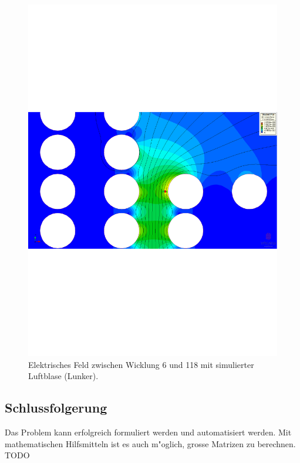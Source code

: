 \begin{refsection}
\begin{figure}
	\centering
	\includegraphics[width=\textwidth]{./trafo/images/VoltageTrans_bubble_turn6_10u_9u.pdf}
	\caption{Elektrisches Feld zwischen Wicklung 6 und 118 mit simulierter Luftblase (Lunker).}
	\label{trafo:E-FieldBubble}
\end{figure}

\subsection{Schlussfolgerung}
Das Problem kann erfolgreich formuliert werden und automatisiert werden. Mit mathematischen Hilfsmitteln ist es auch m"oglich, grosse Matrizen zu berechnen. \color{red} TODO \color{black}

\printbibliography[heading=subbibliography]
\end{refsection}
